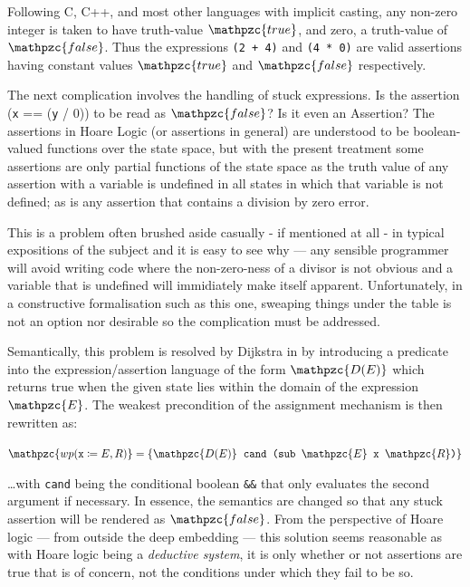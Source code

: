 \documentclass[oneside,12pt]{article}
\newcommand{\impcode}[1]{\textsc{\texttt{#1}}}
\newcommand{\textM}[1]{\ensuremath{\mathpzc{#1}}}
\begin{document}
Following C, C++, and most other languages with implicit casting, any non-zero integer is taken to have truth-value \textM{true}, and zero, a truth-value of \textM{false}. Thus the expressions \texttt{(2 + 4)} and \texttt{(4 * 0)} are valid assertions having constant values \textM{true} and \textM{false} respectively.


The next complication involves the handling of stuck expressions. Is the assertion (\texttt{x} == (\texttt{y} / 0)) to be read as \textM{false}? Is it even an Assertion? The assertions in Hoare Logic (or assertions in general) are understood to be boolean-valued functions over the state space, but with the present treatment some assertions are only partial functions of the state space as the truth value of any assertion with a variable is undefined in all states in which that variable is not defined; as is any assertion that contains a division by zero error.


This is a problem often brushed aside casually - if mentioned at all - in typical expositions of the subject and it is easy to see why --- any sensible programmer will avoid writing code where the non-zero-ness of a divisor is not obvious and a variable that is undefined will immidiately make itself apparent. Unfortunately, in a constructive formalisation such as this one, sweaping things under the table is not an option nor desirable so the complication must be addressed.


Semantically, this problem is resolved by Dijkstra in \cite{Dijkstra76} by introducing a predicate into the expression/assertion language of the form $\textM{D(E)}$ which returns true when the given state lies within the domain of the expression \textM{E}. The weakest precondition of the assignment mechanism is then rewritten as:



\begin{center}
  $ \textM{wp( \texttt{x} \coloneqq E , R )} = \{ \textM{D(E)} \texttt{\;\;cand (sub \textM{E} x \textM{R})} \}$ 
\end{center}


\ldots with \texttt{cand} being the conditional boolean \impcode{\&\&} that only evaluates the second argument if necessary. In essence, the semantics are changed so that any stuck assertion will be rendered as \textM{false}. From the perspective of Hoare logic --- from outside the deep embedding --- this solution seems reasonable as with Hoare logic being a \emph{deductive system}, it is only whether or not assertions are true that is of concern, not the conditions under which they fail to be so.
\end{document}
